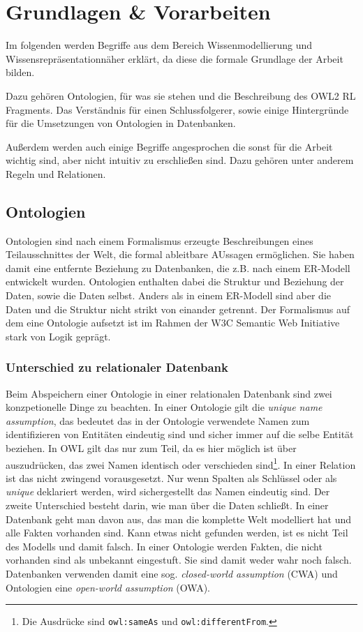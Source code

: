 \chapter{Grundlagen \& Vorarbeiten}
\label{kapitel-grundlagen}
Im folgenden werden Begriffe aus dem Bereich Wissenmodellierung und Wissensrepräsentationnäher erklärt, da diese die formale Grundlage der Arbeit bilden.

Dazu gehören Ontologien, für was sie stehen und die Beschreibung des OWL2 RL Fragments. Das Verständnis für einen Schlussfolgerer, sowie einige Hintergründe für die Umsetzungen von Ontologien in Datenbanken.

Außerdem werden auch einige Begriffe angesprochen die sonst für die Arbeit wichtig sind, aber nicht intuitiv zu erschließen sind. Dazu gehören unter anderem Regeln und Relationen.

\section{Ontologien}

Ontologien sind nach einem Formalismus erzeugte Beschreibungen eines Teilausschnittes der Welt, die formal ableitbare AUssagen ermöglichen. Sie haben damit eine entfernte Beziehung zu Datenbanken, die z.B. nach einem ER-Modell entwickelt wurden. Ontologien enthalten dabei die Struktur und Beziehung der Daten, sowie die Daten selbst. Anders als in einem ER-Modell sind aber die Daten und die Struktur nicht strikt von einander getrennt. Der Formalismus auf dem eine Ontologie aufsetzt ist im Rahmen der W3C Semantic Web Initiative stark von Logik geprägt. \cite{Hesse2002}

\subsection{Unterschied zu relationaler Datenbank}

Beim Abspeichern einer Ontologie in einer relationalen Datenbank sind zwei konzpetionelle Dinge zu beachten. In einer Ontologie gilt die \emph{unique name assumption}, das bedeutet das in der Ontologie verwendete Namen zum identifizieren von Entitäten eindeutig sind und sicher immer auf die selbe Entität beziehen. In OWL gilt das nur zum Teil, da es hier möglich ist über auszudrücken, das zwei Namen identisch oder verschieden sind\cite{OWL1}\footnote{Die Ausdrücke sind \texttt{owl:sameAs} und \texttt{owl:differentFrom}.}. In einer Relation ist das nicht zwingend vorausgesetzt. Nur wenn Spalten als Schlüssel oder als \emph{unique} deklariert werden, wird sichergestellt das Namen eindeutig sind.
Der zweite Unterschied besteht darin, wie man über die Daten schließt. In einer Datenbank geht man davon aus, das man die komplette Welt modelliert hat und alle Fakten vorhanden sind. Kann etwas nicht gefunden werden, ist es nicht Teil des Modells und damit falsch. In einer Ontologie werden Fakten, die nicht vorhanden sind als unbekannt eingestuft. Sie sind damit weder wahr noch falsch. Datenbanken verwenden damit eine sog. \emph{closed-world assumption} (CWA) und Ontologien eine \emph{open-world assumption} (OWA).

